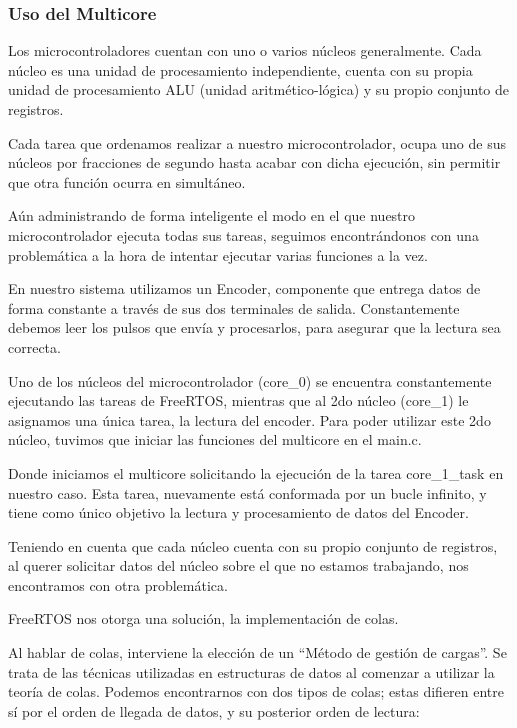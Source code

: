                 \subsubsection{Uso del Multicore}
                    Los microcontroladores cuentan con uno o varios núcleos generalmente. Cada núcleo es una unidad de procesamiento independiente, cuenta con su propia unidad de procesamiento ALU (unidad aritmético-lógica) y su propio conjunto de registros.\par
                    Cada tarea que ordenamos realizar a nuestro microcontrolador, ocupa uno de sus núcleos por fracciones de segundo hasta acabar con dicha ejecución, sin permitir que otra función ocurra en simultáneo.\par
                    Aún administrando de forma inteligente el modo en el que nuestro microcontrolador ejecuta todas sus tareas, seguimos encontrándonos con una problemática a la hora de intentar ejecutar varias funciones a la vez.\par
                    En nuestro sistema utilizamos un Encoder, componente que entrega datos de forma constante a través de sus dos terminales de salida. Constantemente debemos leer los pulsos que envía y procesarlos, para asegurar que la lectura sea correcta.\par 
	                Uno de los núcleos del microcontrolador (core\_0) se encuentra constantemente ejecutando las tareas de FreeRTOS, mientras que al 2do núcleo (core\_1) le asignamos una única tarea, la lectura del encoder.
                    Para poder utilizar este 2do núcleo, tuvimos que iniciar las funciones del multicore en el main.c.\par
                    
                    \par
	                
                    Donde iniciamos el multicore solicitando la ejecución de la tarea core\_1\_task en nuestro caso. Esta tarea, nuevamente está conformada por un bucle infinito, y tiene como único objetivo la lectura y procesamiento de datos del Encoder.\par
	                Teniendo en cuenta que cada núcleo cuenta con su propio conjunto de registros, al querer solicitar datos del núcleo sobre el que no estamos trabajando, nos encontramos con otra problemática.\par
	                FreeRTOS nos otorga una solución, la implementación de colas.\par
                    Al hablar de colas, interviene la elección de un “Método de gestión de cargas”. Se trata de las técnicas utilizadas en estructuras de datos al comenzar a utilizar la teoría de colas. Podemos encontrarnos con dos tipos de colas; estas difieren entre sí por el orden de llegada de datos, y su posterior orden de lectura:\par
                    
